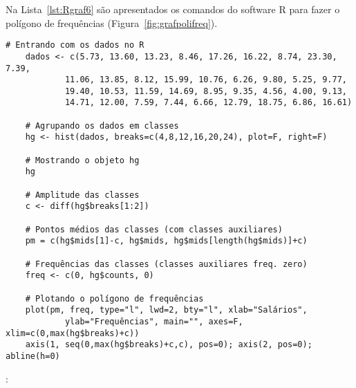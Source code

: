 \documentclass[11pt,fleqn]{book} %
\begin{document}
\vspace{0.5cm}

Na Lista~\ref{lst:Rgraf6} são apresentados os comandos do software R para fazer o polígono de frequências (Figura~\ref{fig:grafpolifreq}).  \\


\begin{scriptsize}
	\estiloR
	\begin{lstlisting}[caption={Comandos do software R}, label=lst:Rgraf6]
	# Entrando com os dados no R
	dados <- c(5.73, 13.60, 13.23, 8.46, 17.26, 16.22, 8.74, 23.30, 7.39,
			11.06, 13.85, 8.12, 15.99, 10.76, 6.26, 9.80, 5.25, 9.77,
			19.40, 10.53, 11.59, 14.69, 8.95, 9.35, 4.56, 4.00, 9.13,
			14.71, 12.00, 7.59, 7.44, 6.66, 12.79, 18.75, 6.86, 16.61)

	# Agrupando os dados em classes 
	hg <- hist(dados, breaks=c(4,8,12,16,20,24), plot=F, right=F)
	
	# Mostrando o objeto hg
	hg
	
	# Amplitude das classes
	c <- diff(hg$breaks[1:2])
	
	# Pontos médios das classes (com classes auxiliares)
	pm = c(hg$mids[1]-c, hg$mids, hg$mids[length(hg$mids)]+c)
	
	# Frequências das classes (classes auxiliares freq. zero)
	freq <- c(0, hg$counts, 0)
	
	# Plotando o polígono de frequências
	plot(pm, freq, type="l", lwd=2, bty="l", xlab="Salários", 
			ylab="Frequências", main="", axes=F, xlim=c(0,max(hg$breaks)+c))
	axis(1, seq(0,max(hg$breaks)+c,c), pos=0); axis(2, pos=0); abline(h=0)

	\end{lstlisting}
\end{scriptsize}

\vspace{0.3cm}

: 
\end{document}

